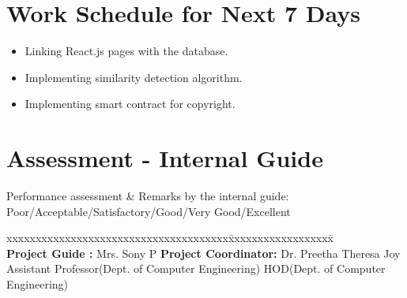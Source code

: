\documentclass{article}
\begin{document}
\section{Work Schedule for Next 7 Days}
\begin{itemize}
\item Linking React.js pages with the database.
\item Implementing similarity detection algorithm.
\item Implementing smart contract for copyright.
\end{itemize}

\section{Assessment - Internal Guide}
Performance assessment \& Remarks by the internal guide: Poor/Acceptable/Satisfactory/Good/Very Good/Excellent
\vspace{1in}
\begin{tabbing}
	xxxxxxxxxxxxxxxxxxxxxxxxxxxxxxxxxxxxxx\= xxxxxxxxxxxxxxxxxx\= \kill
\vspace{.1in}\\	
\textbf{Project Guide :} Mrs. Sony P  \>  \hspace{1.5in}\textbf{Project Coordinator:} Dr. Preetha Theresa Joy\\
        	   Assistant Professor(Dept. of Computer Engineering)\hspace{.5in} 	\> \hspace{1.5in}HOD(Dept. of Computer Engineering)\\

\end{tabbing}
\vspace{.1in}
\end{document}
